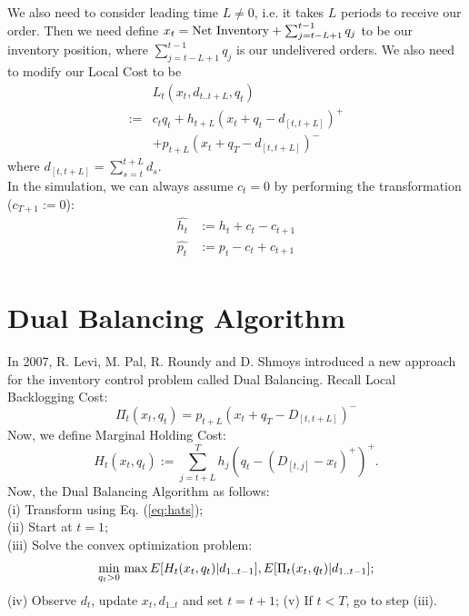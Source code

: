 \documentclass[twoside]{article}
\begin{document}
\begin{multicols}{2}
    We also need to consider leading time $L \neq 0$, i.e. it takes $L$ periods to receive our order. Then we need define $x_t={\rm Net~Inventory}  + \sum_{j = t - L+1}^{t-1} q_j$ to be our inventory position, where $\sum_{j = t - L+1}^{t-1} q_j$ is our undelivered orders. We also need to modify our Local Cost to be
        \begin{equation}\label{eq:Lneq0}
        \begin{array}{rl}
              & L_t(x_t,d_{t..t+L},q_t)\\
          := &c_tq_t + h_{t+L}(x_t + q_t - d_{[t,t+L]})^{+}\\
                                &  + p_{t+L}(x_t + q_T - d_{[t,t+L]})^{-}
        \end{array}
        \end{equation}
        where $d_{[t,t+L]}=\sum_{s=t}^{t+L} d_s$.\\
        In the simulation, we can always assume $c_t = 0$ by performing the transformation ($c_{T+1}:=0$):
        \begin{equation}\label{eq:hats}
        \begin{array}{rl}
          \hat{h_t} &:= h_t + c_t - c_{t+1}\\
          \hat{p_t} &:= p_t - c_t + c_{t+1}\\
        \end{array}
        \end{equation}

\section{Dual Balancing Algorithm}
    In 2007, R. Levi, M. Pal, R. Roundy and D. Shmoys introduced a new approach\cite{CLAcha2} for the inventory control problem called Dual Balancing. Recall Local Backlogging Cost:
    \begin{equation}\label{eq:Bcost}
    \Pi_t(x_t,q_t) = p_{t+L}(x_t + q_T - D_{[t,t+L]})^{-}
    \end{equation}
    Now, we define Marginal Holding Cost:
    \begin{equation}\label{eq:MHcost}
    H_t(x_t,q_t) := \sum_{j = t+L}^{T} h_j (q_t - (D_{[t,j]} - x_t)^+)^+.
    \end{equation}
    Now, the Dual Balancing Algorithm as follows:\\
    (i) Transform using Eq. (\ref{eq:hats});\\
    (ii) Start at $t=1$;\\
    (iii) Solve the convex optimization problem:
    \begin{equation}\label{eq:ConvexOP}
        \min_{q_t > 0}\\ \max{E[H_t(x_t,q_t)| d_{1..t-1}], E[\Pi_t(x_t,q_t)| d_{1..t-1}]};
        \end{equation}
    (iv) Observe $d_t$, update $x_t,d_{1..t}$ and set $t=t+1$;
    (v) If $t<T$, go to step (iii).\\


\end{multicols}
\end{document}
